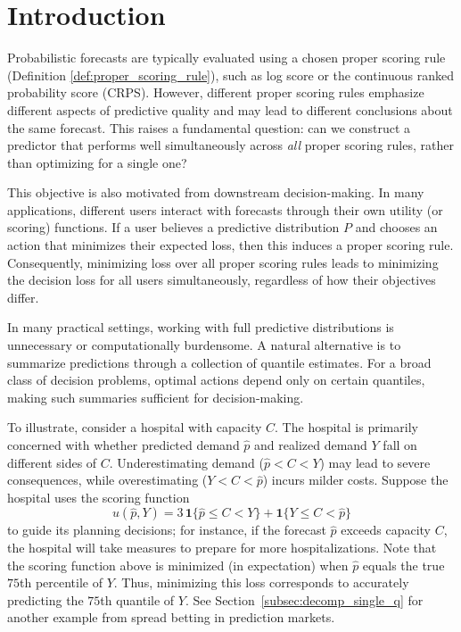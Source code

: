 \section{Introduction}
Probabilistic forecasts are typically evaluated using a chosen proper scoring rule (Definition \ref{def:proper_scoring_rule}), such as log score or the continuous ranked probability score (CRPS). However, different proper scoring rules emphasize different aspects of predictive quality and may lead to different conclusions about the same forecast. This raises a fundamental question: can we construct a predictor that performs well simultaneously across \emph{all} proper scoring rules, rather than optimizing for a single one?

This objective is also motivated from downstream decision-making. In many applications, different users interact with forecasts through their own utility (or scoring) functions. If a user believes a predictive distribution $P$ and chooses an action that minimizes their expected loss, then this induces a proper scoring rule. Consequently, minimizing loss over all proper scoring rules leads to minimizing the decision loss for all users simultaneously, regardless of how their objectives differ. %


In many practical settings, working with full predictive distributions is unnecessary or computationally burdensome. A natural alternative is to summarize predictions through a collection of quantile estimates. For a broad class of decision problems, optimal actions depend only on certain quantiles, making such summaries sufficient for decision-making.

To illustrate, consider a hospital with capacity $C$. The hospital is primarily concerned with whether predicted demand $\hat{p}$ and realized demand $Y$ fall on different sides of $C$. Underestimating demand ($\hat{p} < C < Y$) may lead to severe consequences, while overestimating ($Y < C < \hat{p}$) incurs milder costs. Suppose the hospital uses the scoring function
\[
u(\hat{p}, Y) = 3\,\mathbf{1}\{\hat{p} \leq C < Y\} + \mathbf{1}\{Y \leq C < \hat{p}\}
\]
to guide its planning decisions; for instance, if the forecast $\hat{p}$ exceeds capacity $C$, the hospital will take measures to prepare for more hospitalizations. Note that the scoring function above is minimized (in expectation) when $\hat{p}$ equals the true $75$th percentile of $Y$. Thus, minimizing this loss corresponds to accurately predicting the $75$th quantile of $Y$. See Section~\ref{subsec:decomp_single_q} for another example from spread betting in prediction markets.






